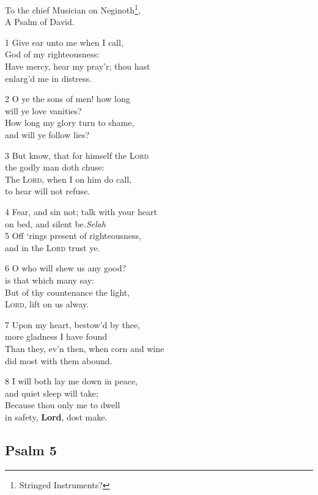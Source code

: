 To the chief Musician on Neginoth\footnote{Stringed Instruments?},\\
A Psalm of David.

1 Give ear unto me when I call,\\
God of my righteousness:\\
Have mercy, hear my pray’r; thou hast\\
enlarg’d me in distress.

2 O ye the sons of men! how long\\
will ye love vanities?\\
How long my glory turn to shame,\\
and will ye follow lies?

3 But know, that for himself the \textsc{Lord}\\
the godly man doth chuse:\\
The \textsc{Lord}, when I on him do call,\\
to hear will not refuse.

4 Fear, and sin not; talk with your heart\\
on bed, and silent be.\hfill \emph{Selah}\\
5 Off ‘rings present of righteousness,\\
and in the \textsc{Lord} trust ye.

6 O who will shew us any good?\\
is that which many say:\\
But of thy countenance the light,\\
\textsc{Lord}, lift on us alway.

7 Upon my heart, bestow’d by thee,\\
more gladness I have found\\
Than they, ev’n then, when corn and wine\\
did most with them abound.

8 I will both lay me down in peace,\\
and quiet sleep will take;\\
Because thou only me to dwell\\
in safety, \textbf{Lord}, dost make.

\begin{center}
\quad{}\quad{}
\end{center}


\subsection*{Psalm 5}

